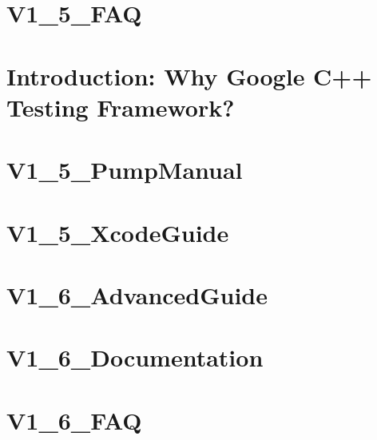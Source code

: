 \documentclass[twoside]{book}
\newcommand{\+}{\discretionary{\mbox{\scriptsize$\hookleftarrow$}}{}{}}
\begin{document}
\chapter{V1\+\_\+5\+\_\+\+FAQ}
\label{md_vendor_googletest_googletest_docs_V1_5_FAQ}

\chapter{Introduction\+: Why Google C++ Testing Framework?}
\label{md_vendor_googletest_googletest_docs_V1_5_Primer}

\chapter{V1\+\_\+5\+\_\+\+Pump\+Manual}
\label{md_vendor_googletest_googletest_docs_V1_5_PumpManual}

\chapter{V1\+\_\+5\+\_\+\+Xcode\+Guide}
\label{md_vendor_googletest_googletest_docs_V1_5_XcodeGuide}

\chapter{V1\+\_\+6\+\_\+\+Advanced\+Guide}
\label{md_vendor_googletest_googletest_docs_V1_6_AdvancedGuide}

\chapter{V1\+\_\+6\+\_\+\+Documentation}
\label{md_vendor_googletest_googletest_docs_V1_6_Documentation}

\chapter{V1\+\_\+6\+\_\+\+FAQ}
\label{md_vendor_googletest_googletest_docs_V1_6_FAQ}

\end{document}

